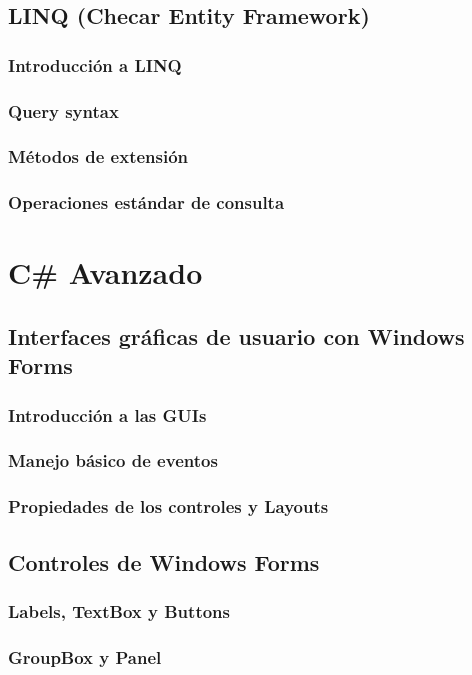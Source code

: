 \documentclass[12pt,a4paper]{report}
\begin{document}
{\chapter{LINQ (Checar Entity Framework)}
\section{Introducción a LINQ}
\section{Query syntax}
\section{Métodos de extensión}
\section{Operaciones estándar de consulta}

\part{C\# Avanzado}
\chapter{ Interfaces gráficas de usuario con Windows Forms}
\section{Introducción a las GUIs}
\section{Manejo básico de eventos}
\section{Propiedades de los controles y Layouts}

\chapter{Controles de Windows Forms}
\section{Labels, TextBox y Buttons}
\section{GroupBox y Panel}
}
\end{document}
